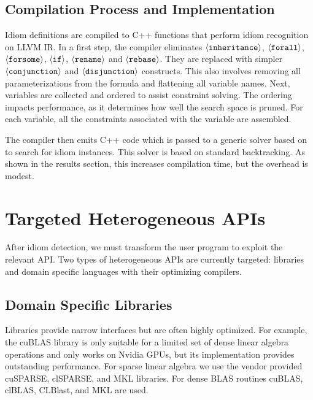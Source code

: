 \subsection{Compilation Process and Implementation}
\label{sec:compilation}

    Idiom definitions are compiled to C++ functions that perform idiom
    recognition on LLVM IR.
    In a first step, the compiler eliminates
    $\left<\text{\tt inheritance}\right>$, $\left<\text{\tt forall}\right>$,
    $\left<\text{\tt forsome}\right>$, $\left<\text{\tt if}\right>$,
    $\left<\text{\tt rename}\right>$ and $\left<\text{\tt rebase}\right>$.
    They are replaced with simpler $\left<\text{\tt conjunction}\right>$ and
    $\left<\text{\tt disjunction}\right>$ constructs.
    This also involves removing all parameterizations from the formula and
    flattening all variable names.
    Next, variables are collected and ordered to assist constraint solving.
    The ordering impacts performance, as it determines how well the search space
    is pruned. 
    For each variable, all the constraints associated with the variable are
    assembled.

    The compiler then emits C++ code which is passed to a generic solver based on \cite{ginsbach2017discovery} to search for idiom instances.
    This solver is based on standard backtracking.
    As shown in the results section, this increases compilation time, but the overhead is modest.

\section{Targeted Heterogeneous APIs}

    After idiom detection, we must transform the user program to exploit the
    relevant API.
    Two types of heterogeneous APIs are currently targeted: libraries and domain
    specific languages with their optimizing compilers.

    \subsection{Domain Specific Libraries}
    Libraries provide narrow interfaces but are often highly optimized.
    For example, the cuBLAS library is only suitable for a limited set of dense
    linear algebra operations and only works on Nvidia GPUs, but its
    implementation provides outstanding performance.
    For sparse linear algebra we use the vendor provided cuSPARSE, clSPARSE, and
    MKL libraries.
    For dense BLAS routines cuBLAS, clBLAS, CLBlast, and MKL are used.

